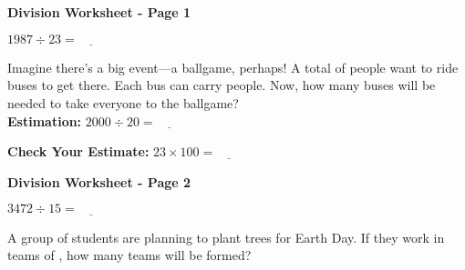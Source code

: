 \documentclass[letterpaper,12pt]{article} %
\begin{document}
\Huge \textbf{Division Worksheet - Page 1}

\huge $ 1987 \div 23 = \underline{\hspace{2em}} $

\vspace{1em} %
\Large Imagine there's a big event—a ballgame, perhaps! A total of \underline{\hspace{2em}} people want to ride buses to get there. Each bus can carry \underline{\hspace{2em}} people. Now, how many buses will be needed to take everyone to the ballgame? \\

\vspace{1em} %
\Large \textbf{Estimation:}
\huge $ 2000 \div 20 = \underline{\hspace{2em}} $

\vspace{1em} %
\Large \textbf{Check Your Estimate:}
\huge $ 23 \times 100 = \underline{\hspace{2em}} $

\vfill

\newpage




\Huge \textbf{Division Worksheet - Page 2}

\huge $ 3472 \div 15 = \underline{\hspace{2em}} $

\vspace{1em} %
\Large A group of \underline{\hspace{2em}} students are planning to plant trees for Earth Day. If they work in teams of \underline{\hspace{2em}}, how many teams will be formed?
\end{document}
